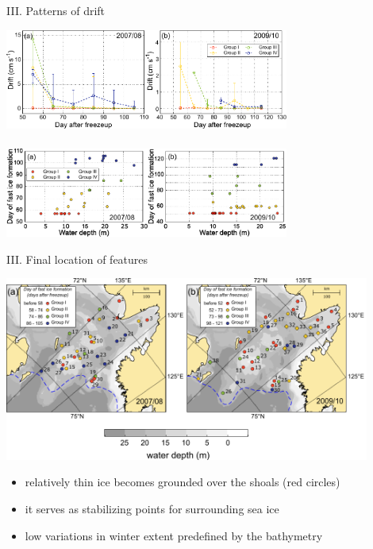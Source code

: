 \documentclass[8pt]{beamer}
\begin{document}
\setwatermark{\fontsize{125pt}{125pt}\selectfont{}}
\begin{frame}[fragile]{III. Patterns of drift}
	\begin{center}
			\includegraphics[width=0.7\textwidth]{./img/groups_graph.pdf}\\~\\
			\includegraphics[width=0.7\textwidth]{./img/groups_depth.pdf}
	\end{center}
\end{frame}

\setwatermark{\fontsize{125pt}{125pt}\selectfont{}}
\begin{frame}[fragile]{III. Final location of features}
\begin{center}
	\includegraphics[width=0.9\textwidth]{./img/groups_map.pdf}
\begin{itemize}
\item relatively thin ice becomes grounded over the shoals (red circles)\\
\item it serves as stabilizing points for surrounding sea ice
\item low variations in winter extent predefined by the bathymetry
\end{itemize}
\end{center}
\end{frame}
\end{document}
